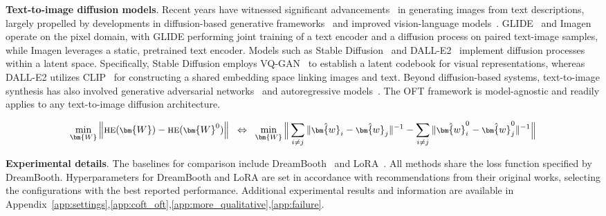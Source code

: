 \begin{itemize}[leftmargin=*,nosep]
\textbf{Text-to-image diffusion models}. Recent years have witnessed significant advancements~\cite{saharia2022photorealistic,ramesh2022hierarchical,rombach2022high,gu2022vector,nichol2022glide} in generating images from text descriptions, largely propelled by developments in diffusion-based generative frameworks~\cite{ho2020denoising,song2021score,song2021denoising,dhariwal2021diffusion} and improved vision-language models~\cite{su2020vlbert,lu2019vilbert,radford2021learning,wang2021simvlm,li2022blip,li2023blip,alayrac2022flamingo,schuhmann2022laion}. GLIDE~\cite{nichol2022glide} and Imagen~\cite{saharia2022photorealistic} operate on the pixel domain, with GLIDE performing joint training of a text encoder and a diffusion process on paired text-image samples, while Imagen leverages a static, pretrained text encoder. Models such as Stable Diffusion~\cite{rombach2022high} and DALL-E2~\cite{ramesh2022hierarchical} implement diffusion processes within a latent space. Specifically, Stable Diffusion employs VQ-GAN~\cite{esser2021taming} to establish a latent codebook for visual representations, whereas DALL-E2 utilizes CLIP~\cite{radford2021learning} for constructing a shared embedding space linking images and text. Beyond diffusion-based systems, text-to-image synthesis has also involved generative adversarial networks~\cite{reed2016generative,zhang2017stackgan,xu2018attngan,li2019controllable} and autoregressive models~\cite{ramesh2021zero,ding2021cogview,wu2022nuwa,yuscaling}. The OFT framework is model-agnostic and readily applies to any text-to-image diffusion architecture.

\begin{equation}\label{eq:oft_principle}
\footnotesize
\min_{\bm{W}} \left\| \text{HE}(\bm{W})-\text{HE}(\bm{W}^0)\right\|~~\Leftrightarrow~~\min_{\bm{W}} \bigg{\|} \sum_{i\neq j} \|\hat{\bm{w}}_i-\hat{\bm{w}}_j\|^{-1}-\sum_{i\neq j} \|\hat{\bm{w}}^0_i-\hat{\bm{w}}^0_j\|^{-1}\bigg{\|}
\end{equation}

\textbf{Experimental details}. The baselines for comparison include DreamBooth~\cite{ruiz2023dreambooth} and LoRA~\cite{hulora2022}. All methods share the loss function specified by DreamBooth. Hyperparameters for DreamBooth and LoRA are set in accordance with recommendations from their original works, selecting the configurations with the best reported performance. Additional experimental results and information are available in Appendix~\ref{app:settings},\ref{app:coft_oft},\ref{app:more_qualitative},\ref{app:failure}.


\end{itemize}
